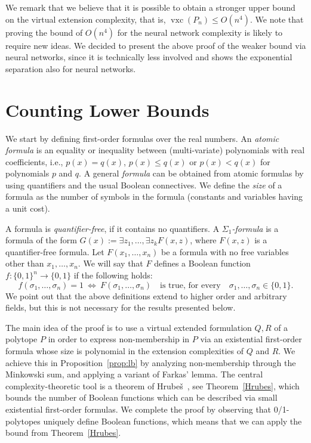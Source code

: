 \documentclass[centering,11pt,reqno]{amsart}
\theoremstyle{definition}
\DeclareMathOperator{\vxc}{vxc}
\newcommand{\defn}[1]{\emph{#1}}
\begin{document}
We remark that we believe that it is possible to obtain a stronger upper bound on the virtual extension complexity, that is, $\vxc(P_n)\le O(n^4)$. 
We note that proving the bound of $O(n^4)$ for the neural network complexity is likely to require new ideas.
We decided to present the above proof of the weaker bound via neural networks, since it is technically less involved and shows the exponential separation also for neural networks.

\section{Counting Lower Bounds}
\label{sec:counting-lower-bound}


We start by defining first-order formulas over the real numbers.
An \defn{atomic formula} is an equality or inequality between (multi-variate) polynomials with real coefficients, i.e., $p(x)=q(x)$, $p(x)\le q(x)$ or $p(x)<q(x)$ for polynomials $p$ and $q$.
A general \defn{formula} can be obtained from atomic formulas by using quantifiers and the usual Boolean connectives.
We define the \defn{size} of a formula as the number of symbols in the formula (constants and variables having a unit cost).

A formula is \defn{quantifier-free}, if it contains no quantifiers.
A \defn{$\Sigma_1$-formula} is a formula of the form $G(x):=\exists z_1,\dots,\exists z_k F(x,z)$, where $F(x,z)$ is a quantifier-free formula.
Let $F(x_1, \dots, x_n)$ be a formula with no free variables other than $x_1, \dots, x_n$. 
We will say that $F$ defines a Boolean function $f : \{0, 1\}^n \to \{0, 1\}$ if the following holds:
\[f (\sigma_1,\dots,\sigma_n) = 1\ \Longleftrightarrow\ F(\sigma_1,\dots,\sigma_n) \quad\text{is true, for every}\quad \sigma_1,\dots,\sigma_n \in \{0, 1\}.\]
We point out that the above definitions extend to higher order and arbitrary fields, but this is not necessary for the results presented below.


The main idea of the proof is to use a virtual extended formulation $Q,R$ of a polytope $P$ in order to express non-membership in $P$ via an existential first-order formula whose size is polynomial in the extension complexities of $Q$ and $R$.
We achieve this in Proposition~\ref{prop:lb} by analyzing non-membership through the Minkowski sum, and applying a variant of Farkas' lemma.
The central complexity-theoretic tool is a theorem of Hrube\v{s}~\cite{Hru20}, see Theorem~\ref{Hrubes}, which bounds the number of Boolean functions which can be described via small existential first-order formulas.
We complete the proof by observing that 0/1-polytopes uniquely define Boolean functions, which means that we can apply the bound from Theorem~\ref{Hrubes}.
\end{document}
